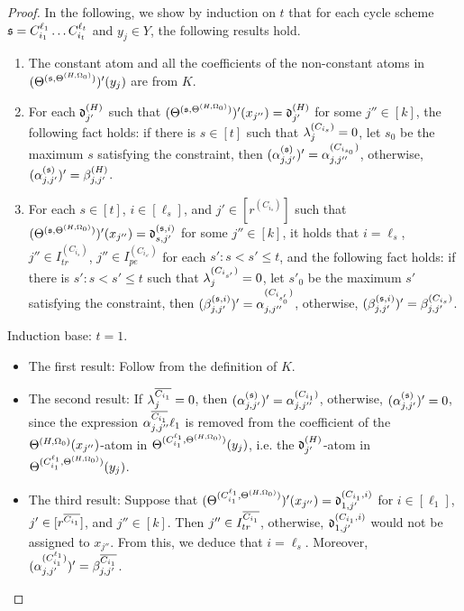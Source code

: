 \begin{appendix}
\begin{proof}
In the following, we show by induction on $t$ that for each cycle scheme ${\mathfrak{s} }=C^{\ell_1}_{i_1} \dots C^{\ell_t}_{i_t}$ and $y_j \in Y$, the following results hold.
\begin{enumerate}
\item The constant atom and all the coefficients of the non-constant atoms in $(\Theta^{({\mathfrak{s} }, \Theta^{(H,\Omega_0)})})'(y_j)$ are from $K$.
%
\item For each $\mathfrak{d}^{(H)}_{j'}$ such that $(\Theta^{({\mathfrak{s} },\Theta^{(H,\Omega_0)})})'(x_{j''})=\mathfrak{d}^{(H)}_{j'}$ for some $j''  \in [k]$, the following fact holds: if there is $s \in [t]$ such that $\lambda^{(C_{i_s})}_j =0$, let $s_0$ be the maximum $s$ satisfying the constraint, then $(\alpha^{({\mathfrak{s} })}_{j,j'})'=\alpha^{(C_{i_{s_0}})}_{j, j''}$, otherwise, $(\alpha^{({\mathfrak{s} })}_{j,j'})'= \beta^{(H)}_{j,j'}$.
%
\item For each $s \in [t]$, $i \in [\ell_s]$, and $j' \in [r^{(C_{i_s})}]$ such that $(\Theta^{({\mathfrak{s} },\Theta^{(H,\Omega_0)})})'(x_{j''})=\mathfrak{d}^{({\mathfrak{s} }, i)}_{s, j'}$ for some $j''  \in [k]$, it holds that $i = \ell_s$, $j'' \in I^{(C_{i_s})}_{tr}$, $j'' \in I^{(C_{i_{s'}})}_{pe}$ for each $s': s < s' \le t$, and the following fact holds: if there is $s': s < s' \le t$ such that $\lambda^{(C_{i_{s'}})}_j =0$, let $s'_0$ be the maximum $s'$ satisfying the constraint, then $(\beta^{({\mathfrak{s} }, i)}_{j,j'})'=\alpha^{(C_{i_{s'_0}})}_{j, j''}$, otherwise, $(\beta^{({\mathfrak{s} }, i)}_{j,j'})'= \beta^{(C_{i_s})}_{j,j'}$. 
\end{enumerate}



Induction base: $t=1$. 
\begin{itemize}
\item The first result: Follow from the definition of $K$. 

\item The second result: If $\lambda^{\overline{C_{i_1}}}_j = 0$, then $(\alpha^{({\mathfrak{s} })}_{j,j'})'=\alpha^{(C_{i_{1}})}_{j, j''}$,  otherwise, $(\alpha^{({\mathfrak{s} })}_{j,j'})'=0$, since the expression $\alpha^{\overline{C_{i_1}}}_{j,j''} \ell_1$ is removed from the coefficient of the $\Theta^{(H,\Omega_0)}(x_{j''})$-atom in $\Theta^{(C^{\ell_1}_{i_1},\Theta^{(H,\Omega_0)})}(y_j)$, i.e. the $\mathfrak{d}^{(H)}_{j'}$-atom in $\Theta^{(C^{\ell_1}_{i_1},\Theta^{(H,\Omega_0)})}(y_j)$. 

\item The third result: Suppose that $(\Theta^{(C^{\ell_1}_{i_1},\Theta^{(H,\Omega_0)})})'(x_{j''})=\mathfrak{d}^{(C_{i_1}, i)}_{1, j'}$ for $i \in [\ell_1]$, $j' \in [r^{\overline{C_{i_1}}}]$, and $j'' \in [k]$. Then $j'' \in I^{\overline{C_{i_1}}}_{tr}$, otherwise, $\mathfrak{d}^{(C_{i_1}, i)}_{1, j'}$ would not be assigned to $x_{j''}$. From this, we deduce that $i = \ell_s$. Moreover, $(\alpha^{(C^{\ell_1}_{i_1})}_{j,j'})'= \beta^{\overline{C_{i_1}}}_{j,j'}$. 
\end{itemize}


\end{proof}
\end{appendix}
